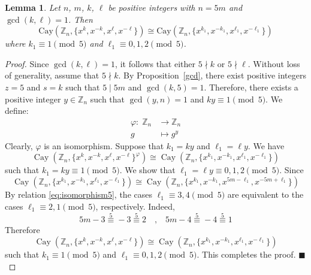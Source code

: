 \documentclass[12pt]{article}
\newtheorem{lemA}[propA]{Lemma}
\begin{document}
 \begin{lemA}\label{lem:five_case}
 	Let $n$, $m$, $k$, $\ell$ be positive integers with $n=5m$ and $\gcd(k,\ell)=1$. Then
 	\[
 	\mathrm{Cay}(\mathbb{Z}_n,\{x^k, x^{-k}, x^\ell, x^{-\ell}\}) \cong
 	\mathrm{Cay}(\mathbb{Z}_n,\{x^{k_1}, x^{-k_1}, x^{\ell_1}, x^{-\ell_1}\})
 	\]
 	where $k_1 \equiv 1 \pmod{5}$ and $\ell_1 \equiv 0,1,2 \pmod{5}$.
 \end{lemA}
 \begin{proof}
Since $\gcd(k,\ell)=1$, it follows that either $5\nmid k$ or $5\nmid \ell$. Without loss of generality, assume that $5\nmid k$. By Proposition~\ref{gcd}, there exist positive integers $z=5$ and $s=k$ such that $5 \mid 5m$ and $\gcd(k,5)=1$. Therefore, there exists a positive integer $y \in \mathbb{Z}_n$ such that
 $\gcd(y,n)=1$ and $ky \equiv 1 \pmod{5}$.
 We define:
 \[
 \begin{aligned}
 	\varphi :\; \mathbb{Z}_n &\to \mathbb{Z}_n \\
 	g &\mapsto g^{y}
 \end{aligned}
 \]
 Clearly, $\varphi$ is an isomorphism. Suppose that $k_1 = ky$ and $\ell_1 = \ell y$. We have
 \[
 \operatorname{Cay}(\mathbb{Z}_n,\{x^k, x^{-k}, x^{\ell}, x^{-\ell}\}^{\varphi})
 \cong
 \operatorname{Cay}(\mathbb{Z}_n,\{x^{k_1}, x^{-k_1}, x^{\ell_1}, x^{-\ell_1}\})
 \]
 such that $k_1 = ky \equiv 1 \pmod{5}$. We show that $\ell_1= \ell y\equiv 0,1,2 \pmod{5}$. Since
 \begin{equation}\label{eq:isomorphism5}
 	\operatorname{Cay}\left(\mathbb{Z}_n,\{x^{k_1},x^{-k_1},x^{\ell_1},x^{-\ell_1}\}\right)
 	\cong
 	\operatorname{Cay}\left(\mathbb{Z}_n,\{x^{k_1},x^{-k_1},x^{5m-\ell_1},x^{-5m+\ell_1}\}\right)
 \end{equation}	
 By relation  \eqref{eq:isomorphism5}, the cases $\ell_1 \equiv 3,4 \pmod{5}$ are equivalent to the cases $\ell_1 \equiv 2,1 \pmod{5}$, respectively. Indeed,
 \[
 5m-3 \stackrel{5}{\equiv} -3 \stackrel{5}{\equiv} 2
 \quad\text{,}\quad
 5m-4 \stackrel{5}{\equiv} -4 \stackrel{5}{\equiv} 1
 \]
  Therefore
 \[
 \operatorname{Cay}(\mathbb{Z}_n,\{x^k, x^{-k}, x^{\ell}, x^{-\ell}\})
 \cong
 \operatorname{Cay}(\mathbb{Z}_n,\{x^{k_1}, x^{-k_1}, x^{\ell_1}, x^{-\ell_1}\})
 \]
 such that $k_1 \equiv 1 \pmod{5}$ and  $\ell_1 \equiv 0,1,2 \pmod{5}$. This completes the proof.
 \hfill$\blacksquare$
 	\end{proof}
\end{document}
